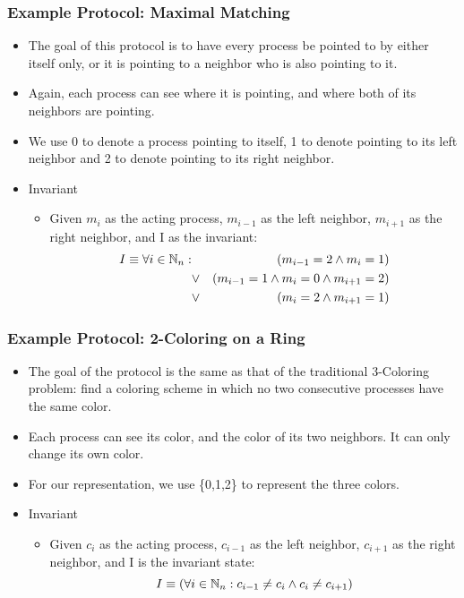 \documentclass[handout]{beamer}
\begin{document}
\begin{frame}
\frametitle{Example Protocol: Maximal Matching}
\begin{itemize}
\item The goal of this protocol is to have every process be pointed to by either itself only, or it
    is pointing to a neighbor who is also pointing to it.
\item Again, each process can see where it is pointing, and where both of its neighbors are
    pointing.
\item We use 0 to denote a process pointing to itself, 1 to denote pointing to its left neighbor
    and 2 to denote pointing to its right neighbor.
\item Invariant
 \begin{itemize}
 \item Given $m_i$ as the acting process, $m_{i-1}$ as the left neighbor, $m_{i+1}$ as the right
    neighbor, and I as the invariant:
  \begin{eqnarray*}
   I \equiv \forall i\in\mathbb{N}_n: & & (m_{i-1} = 2 \wedge m_i = 1)
                    \\ & \vee  & (m_{i-1} = 1 \wedge m_i = 0 \wedge m_{i+1} = 2)
                    \\ & \vee  & (m_i = 2 \wedge m_{i+1} = 1)
  \end{eqnarray*}
 \end{itemize}
\end{itemize}
\end{frame}

\begin{frame}
\frametitle{Example Protocol: 2-Coloring on a Ring}
\begin{itemize}
\item The goal of the protocol is the same as that of the traditional 3-Coloring problem: find a 
    coloring scheme in which no two consecutive processes have the same color.
\item Each process can see its color, and the color of its two neighbors.  It can only change its
    own color.
\item For our representation, we use \{0,1,2\} to represent the three colors.
\item Invariant
 \begin{itemize}
 \item Given $c_i$ as the acting process, $c_{i-1}$ as the left neighbor, $c_{i+1}$ as the right
    neighbor, and I is the invariant state: 
    \[ I \equiv (\forall i\in\mathbb{N}_n: c_{i-1}\ne c_i \wedge c_i \ne c_{i+1}) \]
 \end{itemize}
\end{itemize}
\end{frame}
\end{document}
